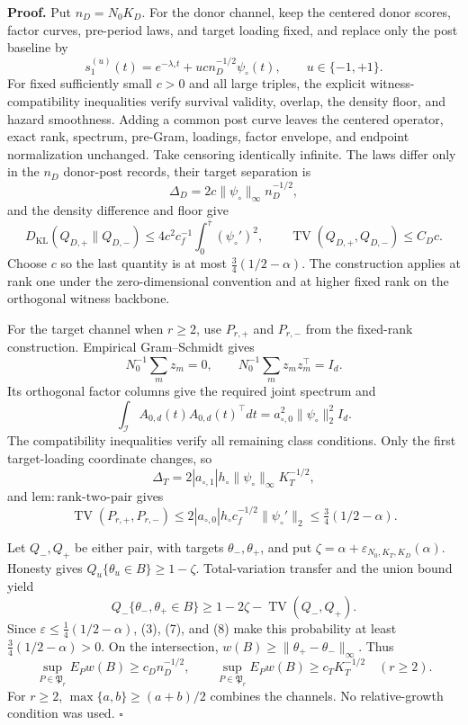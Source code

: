 \textbf{Proof.}
Put \(n_D=N_0K_D\). For the donor channel, keep the centered donor scores, factor curves, pre-period laws, and target loading fixed, and replace only the post baseline by
\[
 s_1^{(u)}(t)=e^{-\lambda_\circ t}+u c n_D^{-1/2}\psi_\circ(t),
 \qquad u\in\{-1,+1\}.                                    \tag{1}
\]
For fixed sufficiently small \(c>0\) and all large triples, the explicit witness-compatibility inequalities verify survival validity, overlap, the density floor, and hazard smoothness. Adding a common post curve leaves the centered operator, exact rank, spectrum, pre-Gram, loadings, factor envelope, and endpoint normalization unchanged. Take censoring identically infinite. The laws differ only in the \(n_D\) donor-post records, their target separation is
\[
 \Delta_D=2c\|\psi_\circ\|_\infty n_D^{-1/2},            \tag{2}
\]
and the density difference and floor give
\[
 D_{\mathrm{KL}}(Q_{D,+}\|Q_{D,-})
 \le4c^2c_f^{-1}\int_0^{\bar\tau}(\psi_\circ')^2,
 \qquad \operatorname{TV}(Q_{D,+},Q_{D,-})\le C_Dc.       \tag{3}
\]
Choose \(c\) so the last quantity is at most \(\tfrac34(1/2-\alpha)\). The construction applies at rank one under the zero-dimensional convention and at higher fixed rank on the orthogonal witness backbone.

For the target channel when \(r\ge2\), use \(P_{r,+}\) and \(P_{r,-}\) from the fixed-rank construction. Empirical Gram--Schmidt gives
\[
 N_0^{-1}\sum_mz_m=0,
 \qquad N_0^{-1}\sum_mz_mz_m^\top=I_d.                    \tag{4}
\]
Its orthogonal factor columns give the required joint spectrum and
\[
 \int_{\mathcal I}A_{0,d}(t)A_{0,d}(t)^\top dt
 =a_{\circ,0}^2\|\psi_\circ\|_2^2I_d.                    \tag{5}
\]
The compatibility inequalities verify all remaining class conditions. Only the first target-loading coordinate changes, so
\[
 \Delta_T=2|a_{\circ,1}|h_\circ\|\psi_\circ\|_\infty K_T^{-1/2}, \tag{6}
\]
and \(\mathrm{lem:rank\mbox{-}two\mbox{-}pair}\) gives
\[
 \operatorname{TV}(P_{r,+},P_{r,-})
 \le2|a_{\circ,0}|h_\circ c_f^{-1/2}\|\psi_\circ'\|_2
 \le\tfrac34(1/2-\alpha).                                 \tag{7}
\]

Let \(Q_-,Q_+\) be either pair, with targets \(\theta_-,\theta_+\), and put \(\zeta=\alpha+\varepsilon_{N_0,K_T,K_D}(\alpha)\). Honesty gives \(Q_u\{\theta_u\in B\}\ge1-\zeta\). Total-variation transfer and the union bound yield
\[
 Q_-\{\theta_-,\theta_+\in B\}
 \ge1-2\zeta-\operatorname{TV}(Q_-,Q_+).                  \tag{8}
\]
Since \(\varepsilon\le\tfrac14(1/2-\alpha)\), (3), (7), and (8) make this probability at least \(\tfrac34(1/2-\alpha)>0\). On the intersection, \(w(B)\ge\|\theta_+-\theta_-\|_\infty\). Thus
\[
 \sup_{P\in\mathfrak P_r}E_Pw(B)\ge c_Dn_D^{-1/2},
 \qquad
 \sup_{P\in\mathfrak P_r}E_Pw(B)\ge c_TK_T^{-1/2}\quad(r\ge2). \tag{9}
\]
For \(r\ge2\), \(\max\{a,b\}\ge(a+b)/2\) combines the channels. No relative-growth condition was used. \(\square\)